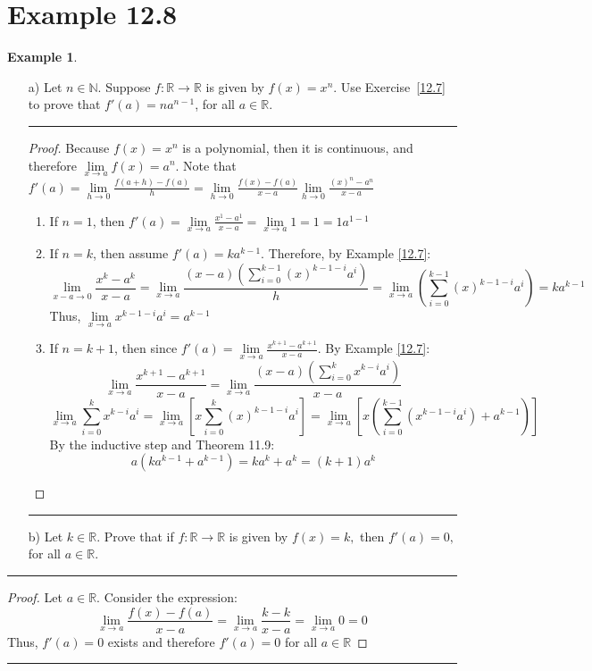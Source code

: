 \documentclass[openany, amssymb, psamsfonts]{amsart}
\newcommand{\bbN}{\mathbb{N}}
\newcommand{\bbR}{\mathbb{R}}
\theoremstyle{definition}
\newtheorem{exmp}{Example}[section]
\numberwithin{equation}{section}
\begin{document}
\section*{Example 12.8}
\begin{exmp}
\begin{enumerate}
\label{12.8}
\item[a)]Let $n\in \bbN.$ Suppose $f:\bbR\to\bbR$ is given by $f(x)=x^n.$ Use Exercise~\ref{12.7} to prove that $f'(a)=na^{n-1}$, for all $a\in \bbR.$
\vspace{4pt}     \hrule   \vspace{4pt} \begin{proof}
Because $f(x) = x^n$ is a polynomial, then it is continuous, and therefore $\lim\limits_{x\to a} f(x) = a^n$.
Note that $f'(a) = \lim\limits_{h\to 0}\frac{f(a+h)-f(a)}{h} = \lim\limits_{h\to 0}\frac{f(x) - f(a)}{x-a}
\lim\limits_{h\to 0}\frac{(x)^n - a^n}{x-a}$
\begin{enumerate}
    \item If $n=1$, then $f'(a) = \lim\limits_{x\to a}\frac{x^1 - a^1}{x-a} =\lim\limits_{x\to a} 1 = 1 = 1a^{1-1}$
    \item If $n=k$, then assume $f'(a)= ka^{k-1}$. Therefore, by Example \ref{12.7}:
    \[\lim\limits_{x-a\to 0}\frac{x^{k} - a^{k}}{x-a} =
    \lim\limits_{x\to a}\frac{(x-a)(\sum_{i=0}^{k-1}(x)^{k-1-i}a^i)}{h} =  \lim\limits_{x\to a}(\sum_{i=0}^{k-1}(x)^{k-1-i}a^i)= ka^{k-1}\] Thus, $\lim\limits_{x\to a} x^{k-1-i}a^i = a^{k-1}$
    \item If $n=k+1$, then since $f'(a) = \lim\limits_{x\to a}\frac{x^{k+1} - a^{k+1}}{x-a}$. By Example \ref{12.7}:
    \[\lim\limits_{x\to a}\frac{x^{k+1} - a^{k+1}}{x-a} =
    \lim\limits_{x\to a}\frac{(x-a)(\sum_{i=0}^k x^{k-i}a^i)}{x-a}\]
    \[\lim\limits_{x\to a} \sum_{i=0}^k x^{k-i}a^i = \lim\limits_{x\to a} [x\sum_{i=0}^{
    k}(x)^{k-1-i}a^i] = \lim\limits_{x\to a} [x(\sum_{i=0}^{k-1}(x^{k-1-i}a^i) + a^{k-1})]\]
    By the inductive step and Theorem 11.9:
    \[ a(ka^{k-1} + a^{k-1}) = ka^k+a^k = (k+1)a^k\]
\end{enumerate}
\end{proof} \vspace{4pt}     \hrule   \vspace{4pt}
\item[b)] Let $k\in\bbR.$ Prove that if $f:\bbR\to\bbR$ is given by $f(x)=k,$ then $f'(a)=0,$ for all $a\in \bbR.$ 
\end{enumerate}
\vspace{4pt}     \hrule   \vspace{4pt} \begin{proof}
Let $a\in \bbR$. Consider the expression:
\[\lim\limits_{x\to a} \frac{f(x) - f(a)}{x-a} = \lim\limits_{x\to a} \frac{k - k}{x-a} = \lim\limits_{x\to a} 0 = 0\] Thus, $f'(a) = 0$ exists and therefore $f'(a) = 0$ for all $a\in \bbR$
\end{proof} \vspace{4pt}     \hrule   \vspace{4pt}
\end{exmp}
\end{document}
